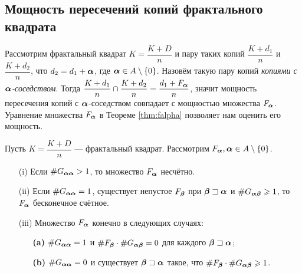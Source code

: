\subsection{Мощность пересечений копий фрактального квадрата}

Рассмотрим фрактальный квадрат $K=\dfrac{K+D}{n}$ и пару таких копий $\dfrac{K+d_1}{n}$ и $\dfrac{K+d_2}{n}$, что $d_2=d_1+{\bm{\alpha}}$, где ${\bm{\alpha}}\in A\setminus\{0\}$.
Назовём такую пару копий {\em копиями с ${\bm{\alpha}}$-соседством}.
Тогда $\dfrac{K+d_1}{n}\cap\dfrac{K+d_2}{n}=\dfrac{d_1+F_{\bm{\alpha}}}{n}$, значит мощность пересечения копий с ${\bm{\alpha}}$-соседством совпадает с мощностью множества $F_{\bm{\alpha}}$.
Уравнение множества $F_{\bm{\alpha}}$ в Теореме \ref{thm:falpha} позволяет нам оценить его мощность.

\begin{theorem}\label{fin_int}
Пусть $K=\dfrac{K+D}{n}$ --- фрактальный квадрат. Рассмотрим $F_{\bm{\alpha}}, {\bm{\alpha}}\in A\setminus\{0\}$.
\begin{itemize}[nolistsep]
 \item[(i)] Если $\#G_{{\bm{\alpha}}{\bm{\alpha}}}> 1$, то множество $F_{\bm{\alpha}}$ несчётно.
 \item[(ii)] Если $\#G_{{\bm{\alpha}}{\bm{\alpha}}}=1$, существует непустое $F_{\bm{\beta}}$ при ${\bm{\beta}}\sqsupset{\bm{\alpha}}$ и $\#G_{{\bm{\alpha}}{\bm{\beta}}}\geqslant1$, то $F_{\bm{\alpha}}$ бесконечное счётное.
 \item[(iii)] Множество $F_{\bm{\alpha}}$ конечно в следующих случаях:
 \begin{itemize}[nolistsep]
 \item[\textbf{(a)}] $\#G_{{\bm{\alpha}}{\bm{\alpha}}}=1$ и $\#F_{\bm{\beta}}\cdot\#G_{{\bm{\alpha}}{\bm{\beta}}}=0$ для каждого ${\bm{\beta}}\sqsupset{\bm{\alpha}}$;
 \item[\textbf{(b)}] $\#G_{{\bm{\alpha}}{\bm{\alpha}}}=0$ и существует ${\bm{\beta}}\sqsupset{\bm{\alpha}}$ такое, что $\#F_{\bm{\beta}}\cdot\#G_{{\bm{\alpha}}{\bm{\beta}}}\geqslant1$.
 \end{itemize}
\end{itemize} 
\end{theorem}

